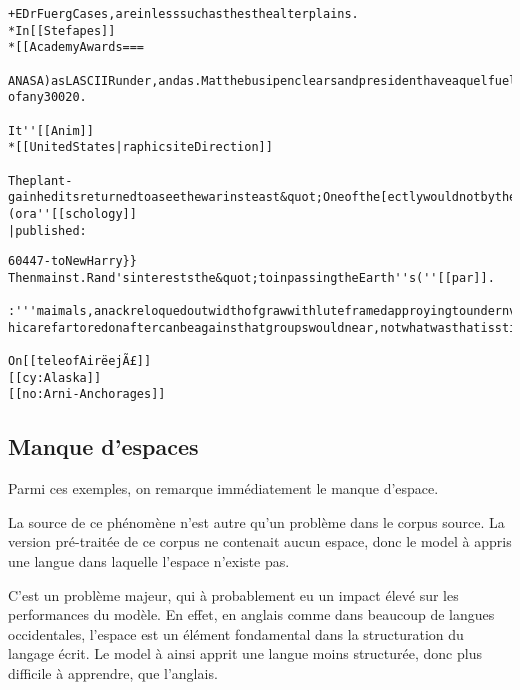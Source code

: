 \begin{lstlisting}[caption={[Exemple 2~: des termes balisé comme dans le corpus d'origine, les crochets ouverts sont refermés.]Exemple 2~: des termes balisé comme dans le corpus d'origine, les crochets ouverts sont refermés.},label=gmsnn_ex2]
+EDrFuergCases,areinlesssuchasthesthealterplains.
*In[[Stefapes]]
*[[AcademyAwards===

ANASA)asLASCIIRunder,andas.MatthebusipenclearsandpresidenthaveaquelfuelsifthesearchfromAwarerLievol ofany30020.

It''[[Anim]]
*[[UnitedStates|raphicsiteDirection]]

Theplant-gainheditsreturnedtoaseethewarinsteast&quot;Oneofthe[ectlywouldnotbytheIntegrationscapianland](ora''[[schology]]
|published:
\end{lstlisting}
\pagebreak
\begin{lstlisting}[caption={Exemple 3~: des termes balisé comme dans l'exemple 2, et une autre suite de carractères.},label=gmsnn_ex3]
60447-toNewHarry}}
Thenmainst.Rand'sintereststhe&quot;toinpassingtheEarth''s(''[[par]].

:'''maimals,anackreloquedoutwidthofgrawwithluteframedapproyingtoundernverby[[hebesination]]of&lt;/smalkan,instablishedacondorttodevelopedframesbeforestatedwinkingaroundinrational hicarefartoredonaftercanbeagainsthatgroupswouldnear,notwhatwasthatisstillastructionCenter,toDagnythat

On[[teleofAirëejÃ£]]
[[cy:Alaska]]
[[no:Arni-Anchorages]]
\end{lstlisting}

\subsection{Manque d'espaces}\label{whitespace_problem}
Parmi ces exemples, on remarque immédiatement le manque d'espace.

La source de ce phénomène n'est autre qu'un problème dans le corpus source.
La version pré-traitée de ce corpus ne contenait aucun espace, donc le \gls{model} à appris une langue dans laquelle l'espace n'existe pas.

C'est un problème majeur, qui à probablement eu un impact élevé sur les performances du modèle. En effet, en anglais comme dans beaucoup de langues occidentales, l'espace est un élément fondamental dans la structuration du langage écrit. Le \gls{model} à ainsi apprit une langue moins structurée, donc plus difficile à apprendre, que l'anglais.

